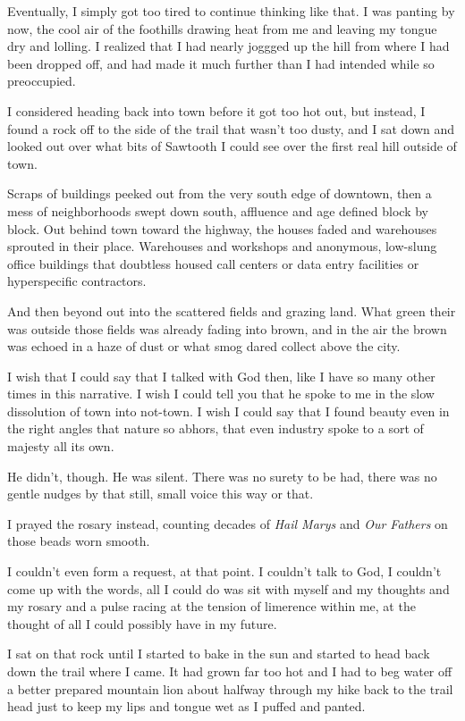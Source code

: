 Eventually, I simply got too tired to continue thinking like that. I was panting by now, the cool air of the foothills drawing heat from me and leaving my tongue dry and lolling. I realized that I had nearly joggged up the hill from where I had been dropped off, and had made it much further than I had intended while so preoccupied.

I considered heading back into town before it got too hot out, but instead, I found a rock off to the side of the trail that wasn't too dusty, and I sat down and looked out over what bits of Sawtooth I could see over the first real hill outside of town.

Scraps of buildings peeked out from the very south edge of downtown, then a mess of neighborhoods swept down south, affluence and age defined block by block. Out behind town toward the highway, the houses faded and warehouses sprouted in their place. Warehouses and workshops and anonymous, low-slung office buildings that doubtless housed call centers or data entry facilities or hyperspecific contractors.

And then beyond out into the scattered fields and grazing land. What green their was outside those fields was already fading into brown, and in the air the brown was echoed in a haze of dust or what smog dared collect above the city.

I wish that I could say that I talked with God then, like I have so many other times in this narrative. I wish I could tell you that he spoke to me in the slow dissolution of town into not-town. I wish I could say that I found beauty even in the right angles that nature so abhors, that even industry spoke to a sort of majesty all its own.

He didn't, though. He was silent. There was no surety to be had, there was no gentle nudges by that still, small voice this way or that.

I prayed the rosary instead, counting decades of \emph{Hail Marys} and \emph{Our Fathers} on those beads worn smooth.

I couldn't even form a request, at that point. I couldn't talk to God, I couldn't come up with the words, all I could do was sit with myself and my thoughts and my rosary and a pulse racing at the tension of limerence within me, at the thought of all I could possibly have in my future.

I sat on that rock until I started to bake in the sun and started to head back down the trail where I came. It had grown far too hot and I had to beg water off a better prepared mountain lion about halfway through my hike back to the trail head just to keep my lips and tongue wet as I puffed and panted.

